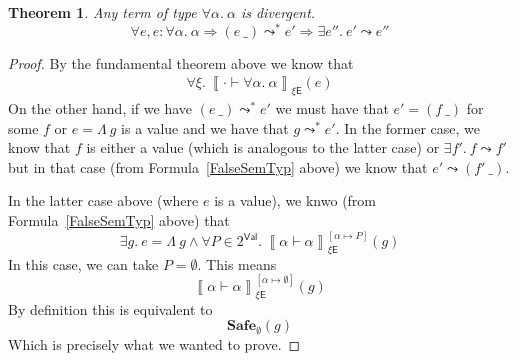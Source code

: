 \documentclass{article}
\newtheorem{theorem}{Theorem}
\newcommand{\EXP}{\mathsf{E}}
\newcommand{\VAL}{\mathsf{Val}}
\newcommand{\semtyp}[3]{\left\llbracket #2 \vdash #3 \right\rrbracket_{#1}}
\newcommand{\semenv}{\xi}
\newcommand{\TArg}{\_}
\newcommand{\TLam}{\Lambda}
\newcommand{\expr}{e}
\newcommand{\exprB}{f}
\newcommand{\exprC}{g}
\newcommand{\tvar}{\alpha}
\newcommand{\step}{\leadsto}
\newcommand{\steps}{\leadsto^*}
\begin{document}
\begin{theorem}
Any term of type $\forall \tvar.~\tvar$ is divergent.
\[
\forall e, e : \forall \tvar.~\tvar \Rightarrow
(\expr~\TArg) \steps \expr' \Rightarrow \exists \expr''.~\expr' \step \expr''
\]
\end{theorem}

\begin{proof}
By the fundamental theorem above we know that
\begin{align}
\forall \semenv.~ \semtyp{\semenv\EXP}{\cdot}{\forall \tvar.~\tvar}(\expr)
\label{FalseSemTyp}
\end{align}
On the other hand, if we have $(\expr~\TArg) \steps \expr'$ we must have
that $\expr' = (\exprB~\TArg)$ for some $\exprB$ or $\expr = \TLam~\exprC$ is a value and
we have that $\exprC \steps \expr'$.
In the former case, we know that $\exprB$ is either a value (which is analogous to the latter case) or $\exists \exprB'.~\exprB \step \exprB'$ but in that
case (from Formula~\ref{FalseSemTyp} above) we know that
$\expr' \step (\exprB'~\TArg)$.

In the latter case above (where $\expr$ is a value), we knwo
(from Formula~\ref{FalseSemTyp} above) that
\[
\exists \exprC.~\expr = \TLam~\exprC \land
\forall P\in 2^{\VAL}.~\semtyp{\semenv\EXP}{\tvar}{\tvar}^{[\tvar \mapsto P]}(\exprC)
\]
In this case, we can take $P = \emptyset$. This means
\[
\semtyp{\semenv\EXP}{\tvar}{\tvar}^{[\tvar \mapsto \emptyset]}(\exprC)
\]
By definition this is equivalent to
\[
\mathbf{Safe}_{\emptyset}(\exprC)
\]
Which is precisely what we wanted to prove.
\end{proof}
\end{document}
